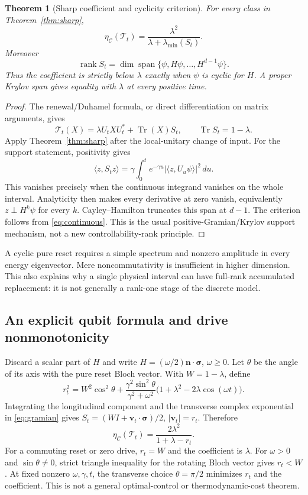 \documentclass[11pt]{article}
\newtheorem{theorem}{Theorem}
\newcommand{\Tr}{\operatorname{Tr}}
\DeclareMathOperator{\rank}{rank}
\begin{document}
\begin{theorem}[Sharp coefficient and cyclicity criterion]\label{thm:continuous}
For every class in Theorem~\ref{thm:sharp},
\begin{equation}\label{eq:continuous}
 \eta_{\mathcal C}(\mathcal T_t)
 =\frac{\lambda^2}{\lambda+\lambda_{\min}(S_t)}.
\end{equation}
Moreover
\[
 \rank S_t=\dim\operatorname{span}\{\psi,H\psi,\ldots,H^{d-1}\psi\}.
\]
Thus the coefficient is strictly below $\lambda$ exactly when $\psi$ is cyclic for $H$. A proper Krylov span gives equality with $\lambda$ at every positive time.
\end{theorem}
\begin{proof}
The renewal/Duhamel formula, or direct differentiation on matrix arguments, gives
\[
 \mathcal T_t(X)=\lambda U_tXU_t^*+\Tr(X)S_t,\qquad \Tr S_t=1-\lambda.
\]
Apply Theorem~\ref{thm:sharp} after the local-unitary change of input. For the support statement, positivity gives
\[
 \langle z,S_tz\rangle=\gamma\int_0^t e^{-\gamma u}|\langle z,U_u\psi\rangle|^2\,du.
\]
This vanishes precisely when the continuous integrand vanishes on the whole interval. Analyticity then makes every derivative at zero vanish, equivalently $z\perp H^k\psi$ for every $k$. Cayley--Hamilton truncates this span at $d-1$. The criterion follows from \eqref{eq:continuous}. This is the usual positive-Gramian/Krylov support mechanism, not a new controllability-rank principle.
\end{proof}
A cyclic pure reset requires a simple spectrum and nonzero amplitude in every energy eigenvector. Mere noncommutativity is insufficient in higher dimension. This also explains why a single physical interval can have full-rank accumulated replacement: it is not generally a rank-one stage of the discrete model.

\subsection{An explicit qubit formula and drive nonmonotonicity}
Discard a scalar part of $H$ and write $H=(\omega/2)\boldsymbol n\cdot\boldsymbol\sigma$, $\omega\ge0$. Let $\theta$ be the angle of its axis with the pure reset Bloch vector. With $W=1-\lambda$, define
\begin{equation}\label{eq:rt}
 r_t^2=W^2\cos^2\theta+
 \frac{\gamma^2\sin^2\theta}{\gamma^2+\omega^2}
 \bigl(1+\lambda^2-2\lambda\cos(\omega t)\bigr).
\end{equation}
Integrating the longitudinal component and the transverse complex exponential in \eqref{eq:gramian} gives $S_t=(WI+\boldsymbol v_t\cdot\boldsymbol\sigma)/2$, $|\boldsymbol v_t|=r_t$. Therefore
\begin{equation}\label{eq:qubitcontrol}
 \eta_{\mathcal C}(\mathcal T_t)=\frac{2\lambda^2}{1+\lambda-r_t}.
\end{equation}
For a commuting reset or zero drive, $r_t=W$ and the coefficient is $\lambda$. For $\omega>0$ and $\sin\theta\ne0$, strict triangle inequality for the rotating Bloch vector gives $r_t<W$. At fixed nonzero $\omega,\gamma,t$, the transverse choice $\theta=\pi/2$ minimizes $r_t$ and the coefficient. This is not a general optimal-control or thermodynamic-cost theorem.
\end{document}
